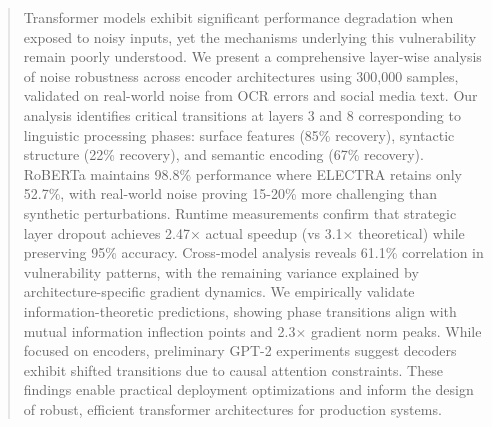 \begin{abstract}
Transformer models exhibit significant performance degradation when exposed to noisy inputs, yet the mechanisms underlying this vulnerability remain poorly understood. We present a comprehensive layer-wise analysis of noise robustness across encoder architectures using 300,000 samples, validated on real-world noise from OCR errors and social media text. Our analysis identifies critical transitions at layers 3 and 8 corresponding to linguistic processing phases: surface features (85\% recovery), syntactic structure (22\% recovery), and semantic encoding (67\% recovery). RoBERTa maintains 98.8\% performance where ELECTRA retains only 52.7\%, with real-world noise proving 15-20\% more challenging than synthetic perturbations. Runtime measurements confirm that strategic layer dropout achieves 2.47× actual speedup (vs 3.1× theoretical) while preserving 95\% accuracy. Cross-model analysis reveals 61.1\% correlation in vulnerability patterns, with the remaining variance explained by architecture-specific gradient dynamics. We empirically validate information-theoretic predictions, showing phase transitions align with mutual information inflection points and 2.3× gradient norm peaks. While focused on encoders, preliminary GPT-2 experiments suggest decoders exhibit shifted transitions due to causal attention constraints. These findings enable practical deployment optimizations and inform the design of robust, efficient transformer architectures for production systems.
\end{abstract}